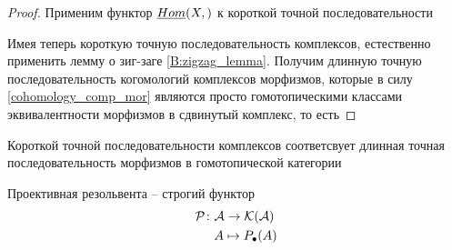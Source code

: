 \documentclass[../main.tex]{subfiles}
\begin{document}
\begin{proof}
Применим функтор $\underline{Hom}(X,)$ к короткой точной последовательности
\bee\label{3:cone_short_exact_eq}
\eee
\bee
{}
\eee
Имея теперь короткую точную последовательность комплексов, естественно применить лемму о зиг-заге \ref{B:zigzag_lemma}. Получим длинную точную последовательность когомологий комплексов морфизмов, которые в силу \ref{cohomology_comp_mor} являются просто гомотопическими классами эквивалентности морфизмов в сдвинутый комплекс, то есть
\bee
{}
\eee
\end{proof}
\begin{to_lem}
    Короткой точной последовательности комплексов соответсвует длинная точная последовательность морфизмов в гомотопической категории
    \bee
{}
    \eee
\bee
{}
    \eee
\end{to_lem}
\begin{to_suj}\label{tactics}
    Проективная резольвента -- строгий функтор
    \begin{align*}
        \mathcal{P}\colon&\mathcal{A} \to\mathcal{K(A)}\\
         &A \mapsto P_\bullet(A)
    \end{align*}
\end{to_suj}
\end{document}

